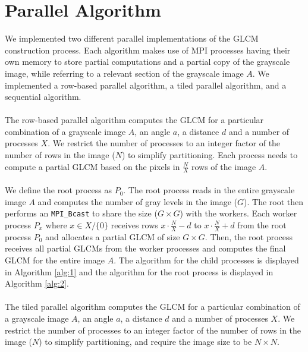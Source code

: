 \documentclass{article}
\begin{document}
\section{Parallel Algorithm}
    We implemented two different parallel implementations of the GLCM construction process. Each algorithm makes use of MPI processes having their own memory to store partial computations and a partial copy of the grayscale image, while referring to a relevant section of the grayscale image $A$. We implemented a row-based parallel algorithm, a tiled parallel algorithm, and a sequential algorithm. \\ \\ 
    The row-based parallel algorithm computes the GLCM for a particular combination of a grayscale image $A$, an angle $a$, a distance $d$ and a number of processes $X$. We restrict the number of processes to an integer factor of the number of rows in the image ($N$) to simplify partitioning. Each process needs to compute a partial GLCM based on the pixels in $\frac{N}{X}$ rows of the image $A$. \\ \\ 
    We define the root process as $P_0$. The root process reads in the entire grayscale image $A$ and computes the number of gray levels in the image ($G$). The root then performs an \texttt{MPI\_Bcast} to share the size ($G \times G$) with the workers. Each worker process $P_x$ where $x \in X / \{0\}$ receives rows $x \cdot \frac{N}{X} - d$ to $x \cdot \frac{N}{X} + d$ from the root process $P_0$ and allocates a partial GLCM of size $G \times G$. Then, the root process receives all partial GLCMs from the worker processes and computes the final GLCM for the entire image $A$. The algorithm for the child processes is displayed in Algorithm \ref{alg:1} and the algorithm for the root process is displayed in Algorithm \ref{alg:2}. \\ \\ 
    The tiled parallel algorithm computes the GLCM for a particular combination of a grayscale image $A$, an angle $a$, a distance $d$ and a number of processes $X$. We restrict the number of processes to an integer factor of the number of rows in the image ($N$) to simplify partitioning, and require the image size to be $N \times N$.
\end{document}
